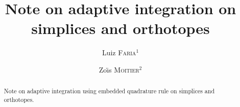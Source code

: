 \documentclass[english,12pt]{article}
\title{Note on adaptive integration on simplices and orthotopes}
\author{
    Luiz \textsc{Faria}\({}^1\)
    \and
    Zo{\"\i}s \textsc{Moitier}\({}^2\)
}
\date{\raggedright\footnotesize%
    \({^1}\)POEMS, CNRS, Inria, ENSTA Paris, Institut Polytechnique de Paris, 91120 Palaiseau, France.\\
    \({}^2\)IDEFIX, Inria, ENSTA Paris, Institut Polytechnique de Paris, 91120 Palaiseau, France.\\[1em]
    \large\Red{\textbf{\today}}
}
\numberwithin{equation}{section}
\theoremstyle{definition}
\theoremstyle{plain}
\theoremstyle{remark}
\begin{document}
\maketitle

\begin{abstract}
    Note on adaptive integration using embedded quadrature rule on simplices and orthotopes.
\end{abstract}

\setcounter{tocdepth}{2}
\tableofcontents












\end{document}

